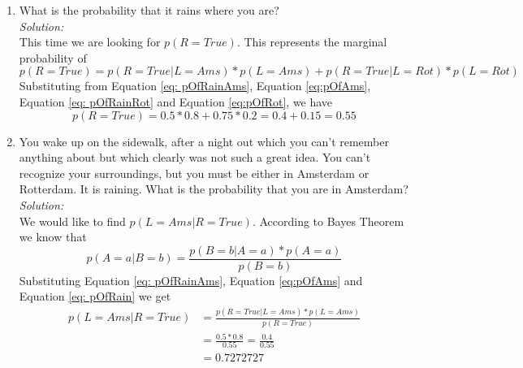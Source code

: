 \documentclass{../amsml}
\begin{document}
\begin{problem}
\begin{enumerate}
	\item What is the probability that it rains where you are? \\
		\emph{Solution:} \\
			This time we are looking for $p(R=True)$. This represents the marginal probability of
			\begin{displaymath}
				p(R=True) = p(R=True | L = Ams) * p(L=Ams) + p(R=True | L = Rot) * p(L=Rot)
			\end{displaymath}
			Substituting from Equation \ref{eq: pOfRainAms}, Equation \ref{eq:pOfAms}, Equation \ref{eq: pOfRainRot} and Equation \ref{eq:pOfRot}, we have
			\begin{equation} \label{eq: pOfRain}
				p(R=True) = 0.5 * 0.8 + 0.75 * 0.2 = 0.4 + 0.15 = 0.55
			\end{equation}
			  
	\item You wake up on the sidewalk, after a night out which you can't remember anything about but which clearly was not such a great idea. You can't recognize your surroundings, but you must be either in Amsterdam or Rotterdam. It is raining. What is the probability that you are in Amsterdam? \\
		\emph{Solution:} \\
			We would like to find $p(L= Ams | R=True)$. According to Bayes Theorem we know that
			\begin{equation} \label{eq: Bayes Theorem}
				p(A=a | B=b) = \frac{p(B=b | A=a) * p(A=a)}{p(B=b)}
			\end{equation} 
			Substituting Equation \ref{eq: pOfRainAms}, Equation \ref{eq:pOfAms} and Equation \ref{eq: pOfRain} we get 
			\begin{displaymath}
				\begin{split}
					p(L=Ams | R=True)& = \frac{p(R=True | L=Ams) * p(L=Ams)}{p(R=True)} \\
					& = \frac{0.5 * 0.8}{0.55} = \frac{0.4}{0.55} \\
					& = 0.7272727 \\
				\end{split}
			\end{displaymath}
	
\end{enumerate}
\end{problem}

\end{document}
